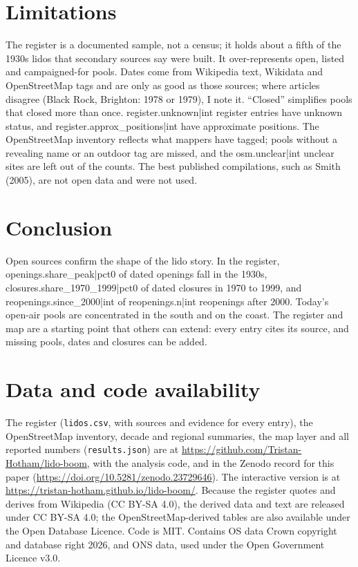 \documentclass[11pt,a4paper]{article}
\begin{document}
\section{Limitations}

The register is a documented sample, not a census; it holds about a fifth of the 1930s lidos that secondary sources say were built. It over-represents open, listed and campaigned-for pools. Dates come from Wikipedia text, Wikidata and OpenStreetMap tags and are only as good as those sources; where articles disagree (Black Rock, Brighton: 1978 or 1979), I note it. ``Closed'' simplifies pools that closed more than once. {{register.unknown|int}} register entries have unknown status, and {{register.approx_positions|int}} have approximate positions. The OpenStreetMap inventory reflects what mappers have tagged; pools without a revealing name or an outdoor tag are missed, and the {{osm.unclear|int}} unclear sites are left out of the counts. The best published compilations, such as Smith (2005), are not open data and were not used.

\section{Conclusion}

Open sources confirm the shape of the lido story. In the register, {{openings.share_peak|pct0}} of dated openings fall in the 1930s, {{closures.share_1970_1999|pct0}} of dated closures in 1970 to 1999, and {{reopenings.since_2000|int}} of {{reopenings.n|int}} reopenings after 2000. Today's open-air pools are concentrated in the south and on the coast. The register and map are a starting point that others can extend: every entry cites its source, and missing pools, dates and closures can be added.

\section*{Data and code availability}

The register (\texttt{lidos.csv}, with sources and evidence for every entry), the OpenStreetMap inventory, decade and regional summaries, the map layer and all reported numbers (\texttt{results.json}) are at \url{https://github.com/Tristan-Hotham/lido-boom}, with the analysis code, and in the Zenodo record for this paper (\url{https://doi.org/10.5281/zenodo.23729646}). The interactive version is at \url{https://tristan-hotham.github.io/lido-boom/}. Because the register quotes and derives from Wikipedia (CC BY-SA 4.0), the derived data and text are released under CC BY-SA 4.0; the OpenStreetMap-derived tables are also available under the Open Database Licence. Code is MIT. Contains OS data \textcopyright{} Crown copyright and database right 2026, and ONS data, used under the Open Government Licence v3.0.
\end{document}

